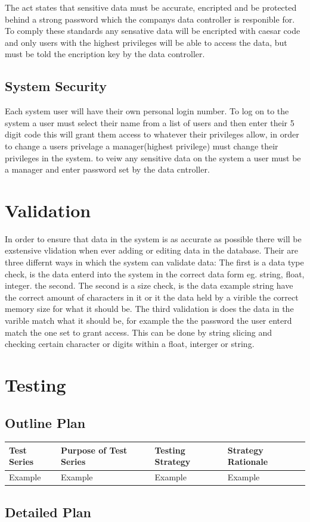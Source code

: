 The act states that sensitive data must be accurate, encripted and be protected behind a strong password which the companys data controller is responible for. To comply these standards any sensative data will be encripted with caesar code  and only users with the highest privileges will be able to access the data, but must be told the encription key by the data controller.

\subsection{System Security}

Each system user will have their own personal login number. To log on to the system a user must select their name from a list of users and then enter their 5 digit code this will grant them access to whatever their privileges allow, in order to change a users privelage a manager(highest privilege) must change their privileges in the system. to veiw any sensitive data on the system a user must be a manager and enter password set by the data cntroller.

\section{Validation}

In order to ensure that data in the system is as accurate as possible there will be exstensive vlidation when ever adding or editing data in the database. Their are three differnt ways in which the system can validate data: The first is a data type check, is the data enterd into the system in the correct data form eg. string, float, integer. the second. The second is a size check, is the data example string have the correct amount of characters in it or it the data held by a virible the correct memory size for what it should be. The third validation is does the data in the varible match what it should be, for example the the password the user enterd match the one set to grant access. This can be done by string slicing and checking certain character or digits within a float, interger or string.

\section{Testing}

\begin{landscape}
\subsection{Outline Plan}

\begin{center}
    \begin{tabular}{|p{2cm}|p{5cm}|p{5cm}|p{4cm}|}
        \hline
        \textbf{Test Series} & \textbf{Purpose of Test Series} & \textbf{Testing Strategy} & \textbf{Strategy Rationale}\\ \hline
        Example & Example & Example & Example \\ \hline
    \end{tabular}
\end{center}
\end{landscape}
\subsection{Detailed Plan}
